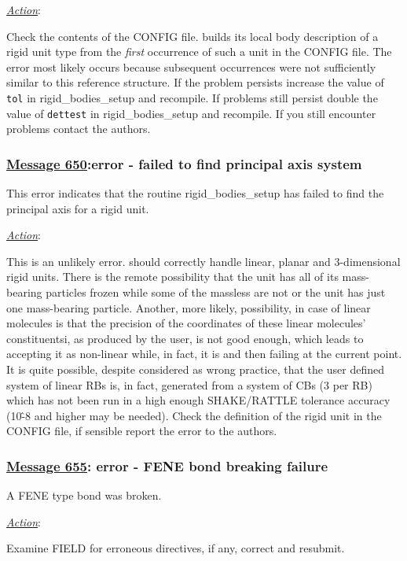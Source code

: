 \noindent \underline{\em Action}:

Check the contents of the CONFIG file.  \D builds its local body
description of a rigid unit type from the {\em first} occurrence of
such a unit in the CONFIG file.  The error most likely occurs
because subsequent occurrences were not sufficiently similar
to this reference structure.  If the problem persists increase
the value of {\tt tol} in {\sc rigid\_bodies\_setup} and recompile.
If problems still persist double the value of {\tt dettest} in
{\sc rigid\_bodies\_setup} and recompile.  If you still
encounter problems contact the authors.

\subsubsection*{\underline{Message 650}:error - failed to find principal axis system}

This error indicates that the routine {\sc rigid\_bodies\_setup}
has failed to find the principal axis for a rigid unit.

\noindent \underline{\em Action}:

This is an unlikely error.  \D should correctly handle linear,
planar and 3-dimensional rigid units.  There is the remote
possibility that the unit has all of its mass-bearing particles
frozen while some of the massless are not or the unit has just
one mass-bearing particle.  Another, more likely, possibility,
in case of linear molecules is that the precision of the coordinates
of these linear molecules' constituentsi, as produced by the user,
is not good enough, which leads \D to accepting it as non-linear
while, in fact, it is and then failing at the current point.
It is quite possible, despite considered as wrong practice, that
the user defined system of linear RBs is, in fact, generated from
a system of CBs (3 per RB) which has not been run in a high enough
SHAKE/RATTLE tolerance accuracy (10\^-8 and higher may be needed).
Check the definition of the rigid unit in the CONFIG file,
if sensible report the error to the authors.

\subsubsection*{\underline{Message 655}: error - FENE bond breaking failure}

A FENE type bond was broken.

\noindent \underline{\em Action}:

Examine FIELD for erroneous directives, if any, correct and resubmit.

